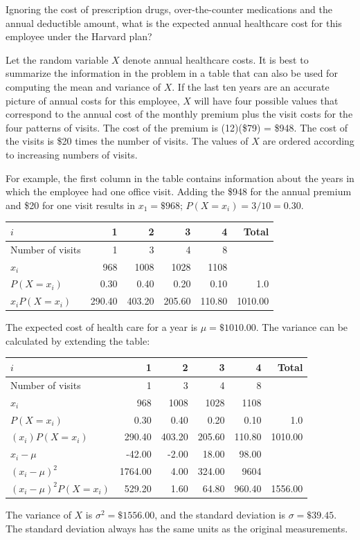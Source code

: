 \begin{example} {Ignoring the cost of prescription drugs, over-the-counter medications and the annual deductible amount, what is the expected annual healthcare cost for this employee under the Harvard plan?}  

Let the random variable $X$ denote annual healthcare costs.  It is best to summarize the information in the problem in a table that can also be used for computing the mean and variance of $X$.  If the  last ten years are an accurate picture of annual costs for this employee, $X$ will have four possible values that correspond to the annual cost of the monthly premium plus the visit costs for the four patterns of visits.  The cost of the premium is (12)(\$79) = \$948. The cost of the visits is \$20 times the number of visits.  The values of $X$ are ordered according to increasing numbers of visits. 

For example, the first column in the table contains information about the years in which the employee had one office visit. Adding the \$948 for the annual premium and \$20 for one visit results in $x_{1}=\$968$; $P(X=x_{i}) = 3/10 = 0.30$.

\begin{center}
\begin{tabular}{l rrrr r}
\hline
$i$ & 1 & 2 & 3 & 4 & Total \\
\hline
Number of visits & 1 & 3 & 4 & 8 &\\
$x_i$ & 968 & 1008 & 1028 & 1108 &  \\
$P(X=x_i)$ & 0.30 & 0.40 & 0.20 & 0.10 & 1.0 \\
$x_i P(X=x_i)$ & 290.40 & 403.20 & 205.60 & 110.80 & 1010.00 \\
\hline
\end{tabular}
\end{center}
The expected cost of health care for a year is $\mu=\$1010.00$. The variance can be calculated by extending the table:
\begin{center}
\begin{tabular}{l rrrr r}
\hline
$i$ & 1 & 2 & 3 & 4 & Total \\
\hline
Number of visits & 1 & 3 & 4 & 8 &\\
$x_i$ & 968 & 1008 & 1028 & 1108 &  \\
$P(X=x_i)$ & 0.30 & 0.40 & 0.20 & 0.10 & 1.0 \\
$(x_i)P(X=x_i)$ & 290.40 & 403.20 & 205.60 & 110.80 & 1010.00 \\
$x_i - \mu$ & -42.00  & -2.00  & 18.00  & 98.00 & \\
$(x_i - \mu)^2$ &  1764.00 & 4.00  & 324.00  & 9604 & \\
$(x_i - \mu)^2 P(X=x_i)$ & 529.20  & 1.60  & 64.80  & 960.40 & 1556.00\\
\hline
\end{tabular}
\end{center}
The variance of $X$ is $\sigma^2 = \$1556.00$, and the standard deviation is $\sigma = \$39.45$.  The standard deviation always has the same units as the original measurements. 

\end{example}


